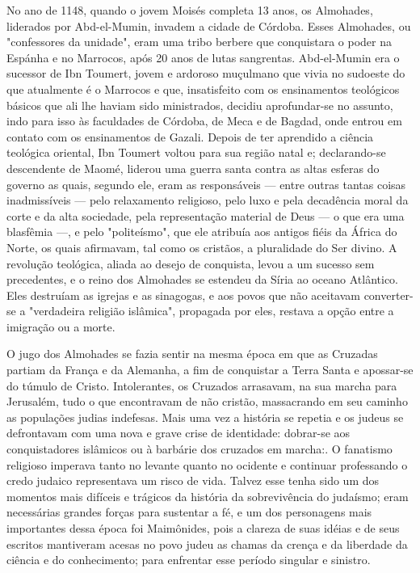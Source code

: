 \begin{itemize}
No ano de 1148, quando o jovem Moisés completa 13 anos, os Al­mohades,
liderados por Abd-el-Mumin, invadem a cidade de Córdoba. Esses
Almohades, ou "confessores da unidade", eram uma tribo berbere que
con­quistara o poder na Espánha e no Marrocos, após 20 anos de lutas
sangrentas. Abd-el-Mumin era o sucessor de Ibn Toumert, jovem e ardoroso
muçulmano que vivia no sudoeste do que atualmente é o Marrocos e que,
insatisfeito com os ensinamentos teológicos básicos que ali lhe haviam
sido ministrados, deci­diu aprofundar-se no assunto, indo para isso às
faculdades de Córdoba, de Me­ca e de Bagdad, onde entrou em contato com
os ensinamentos de Gazali. De­pois de ter aprendido a ciência teológica
oriental, Ibn Toumert voltou para sua região natal e; declarando-se
descendente de Maomé, liderou uma guerra santa contra as altas esferas
do governo as quais, segundo ele, eram as responsáveis --- entre outras
tantas coisas inadmissíveis --- pelo relaxamento religioso, pelo luxo e
pela decadência moral da corte e da alta sociedade, pela representação
material de Deus --- o que era uma blasfêmia ---, e pelo "politeísmo",
que ele atribuía aos antigos fiéis da África do Norte, os quais
afirmavam, tal como os cristãos, a pluralidade do Ser divino. A
revolução teológica, aliada ao desejo de conquista, levou a um sucesso
sem precedentes, e o reino dos Almohades se estendeu da Síria ao oceano
Atlântico. Eles destruíam as igrejas e as sinago­gas, e aos povos que
não aceitavam converter-se a "verdadeira religião islâmi­ca", propagada
por eles, restava a opção entre a imigração ou a morte.

O jugo dos Almohades se fazia sentir na mesma época em que as Cru­zadas
partiam da França e da Alemanha, a fim de conquistar a Terra Santa e
apossar-se do túmulo de Cristo. Intolerantes, os Cruzados arrasavam, na
sua mar­cha para Jerusalém, tudo o que encontravam de não cristão,
massacrando em seu caminho as populações judias indefesas. Mais uma vez
a história se repetia e os judeus se defrontavam com uma nova e grave
crise de identidade: dobrar-se aos conquistadores islâmicos ou à
barbárie dos cruzados em marcha:. O fana­tismo
religioso imperava tanto no levante quanto no ocidente e continuar
pro­fessando o credo judaico representava um risco de vida. Talvez esse
tenha sido um dos momentos mais difíceis e trágicos da história da
sobrevivência do ju­daísmo; eram necessárias grandes forças para
sustentar a fé, e um dos persona­gens mais importantes dessa época foi
Maimônides, pois a clareza de suas idéias e de seus escritos mantiveram
acesas no povo judeu as chamas da crença e da liberdade da ciência e do
conhecimento; para enfrentar esse período singular e sinistro.


\end{itemize}
